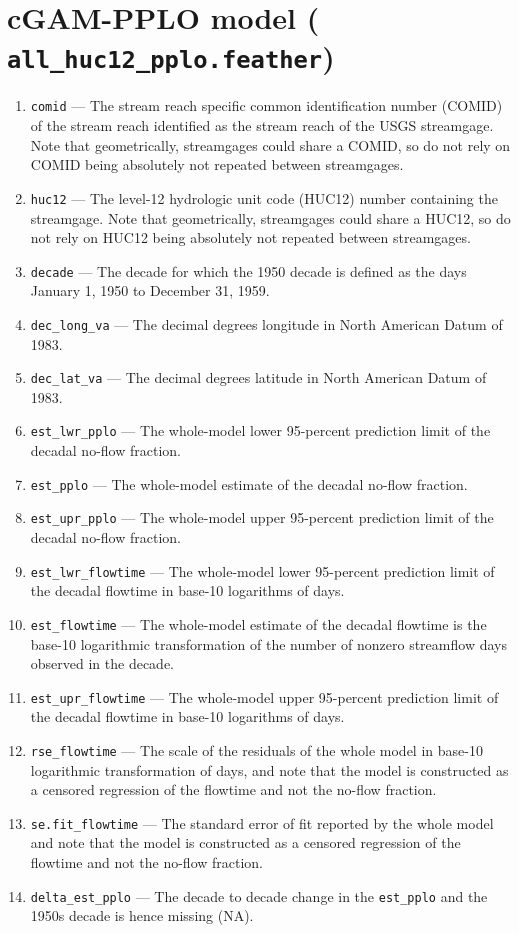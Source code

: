 \documentclass[1p, authoryear, 11pt, times, preprint]{elsarticle}
\newcommand{\code}[1]{{\color{black}%
                       \mbox{\lstinline[basicstyle={\small\ttfamily},
                                        keywordstyle=\scriptsize\ttfamily]|#1|}}}
\begin{document}
\singlespacing

\section{cGAM-PPLO model (\code{all_huc12_pplo.feather})}



\begin{enumerate}
\footnotesize
\RaggedRight
\item \code{comid} --- The stream reach specific common identification number (COMID) of the stream reach identified as the stream reach of the USGS streamgage. Note that geometrically, streamgages could share a COMID, so do not rely on COMID being absolutely not repeated between streamgages.
\item \code{huc12} --- The level-12 hydrologic unit code (HUC12) number containing the streamgage. Note that geometrically, streamgages could share a HUC12, so do not rely on HUC12 being absolutely not repeated between streamgages.
\item \code{decade} --- The decade for which the 1950 decade is defined as the days January 1, 1950 to December 31, 1959.
\item \code{dec_long_va} --- The decimal degrees longitude in North American Datum of 1983.
\item \code{dec_lat_va} --- The decimal degrees latitude in North American Datum of 1983.
\item \code{est_lwr_pplo} --- The whole-model lower 95-percent prediction limit of the decadal no-flow fraction.
\item \code{est_pplo} --- The whole-model estimate of the decadal no-flow fraction.
\item \code{est_upr_pplo} --- The whole-model upper 95-percent prediction limit of the decadal no-flow fraction.
\item \code{est_lwr_flowtime} --- The whole-model lower 95-percent prediction limit of the decadal flowtime in base-10 logarithms of days.
\item \code{est_flowtime} --- The whole-model estimate of the decadal flowtime is the base-10 logarithmic transformation of the number of nonzero streamflow days observed in the decade.
\item \code{est_upr_flowtime} --- The whole-model upper 95-percent prediction limit of the decadal flowtime in base-10 logarithms of days.
\item \code{rse_flowtime} --- The scale of the residuals of the whole model in base-10 logarithmic transformation of days, and note that the model is constructed as a censored regression of the flowtime and not the no-flow fraction.
\item \code{se.fit_flowtime} --- The standard error of fit reported by the whole model and note that the model is constructed as a censored regression of the flowtime and not the no-flow fraction.
\item \code{delta_est_pplo} --- The decade to decade change in the \code{est_pplo} and the 1950s decade is hence missing (NA).
\end{enumerate}
\end{document}
